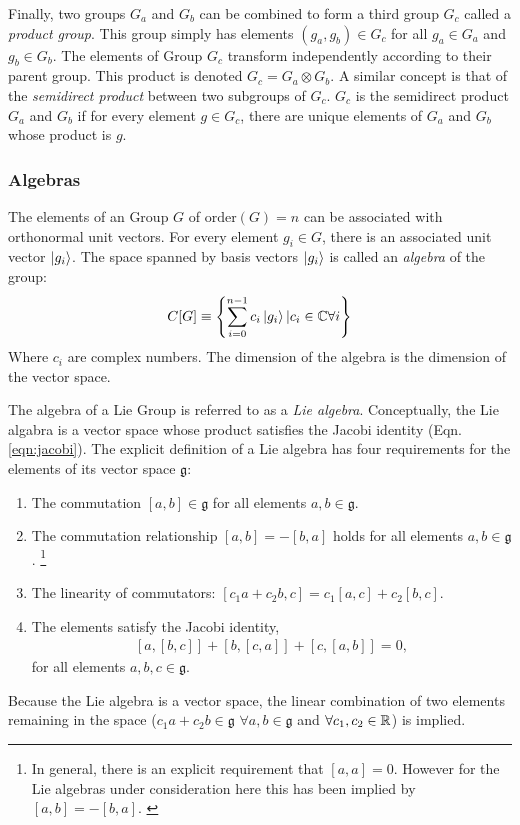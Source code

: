 Finally, two groups $G_a$ and $G_b$ can be combined to form a third group $G_c$ called a \emph{product group}.
This group simply has elements $(g_a,g_b)\in G_c$ for all $g_a\in G_a$ and $g_b\in G_b$.
The elements of Group $G_c$ transform independently according to their parent group.
This product is denoted $G_c=G_a\otimes G_b$.
A similar concept is that of the \emph{semidirect product} between two subgroups of $G_c$.
$G_c$ is the semidirect product $G_a$ and $G_b$ if for every element $g\in G_c$, there are unique elements of $G_a$ and $G_b$ whose product is $g$.

\subsubsection{Algebras}\label{sec:algebras}

The elements of an Group $G$ of $\text{order}(G)=n$ can be associated with orthonormal unit vectors. 
For every element $g_i\in G$, there is an associated unit vector $\ket{g_i}$.
The space spanned by basis vectors $\ket{g_i}$ is called an \emph{algebra} of the group:
\begin{equation}\begin{split}\label{eqn:algebra}
    C[G]\equiv\left\{\sum_{i=0}^{n-1}c_i\ket{g_i}\vert c_i\in \mathbb{C} \forall i\right\}
\end{split}\end{equation} 
Where $c_i$ are complex numbers. The dimension of the algebra is the dimension of the vector space.

The algebra of a Lie Group is referred to as a \emph{Lie algebra}.
Conceptually, the Lie algabra is a vector space whose product satisfies the Jacobi identity (Eqn. \ref{eqn:jacobi}).
The explicit definition of a Lie algebra has four requirements for the elements of its vector space $\mathfrak{g}$:
\begin{enumerate}
    \item The commutation $[a,b]\in\mathfrak{g}$ for all elements $a,b\in\mathfrak{g}$.
    \item The commutation relationship $[a,b]=-[b,a]$ holds for all elements $a,b\in\mathfrak{g}$. \footnote[1]{In general, there is an explicit requirement that $[a,a]=0$. However for the Lie algebras under consideration here this has been implied by $[a,b]=-[b,a]$. \cite{pfeifer}}
    \item The linearity of commutators: $[c_1a+c_2b,c]=c_1[a,c]+c_2[b,c]$.
    \item The elements satisfy the Jacobi identity,
    \begin{equation}\begin{split}\label{eqn:jacobi}
        [a,[b,c]]+[b,[c,a]]+[c,[a,b]]=0,
    \end{split}\end{equation} 
    for all elements $a,b,c\in\mathfrak{g}$.
\end{enumerate}
Because the Lie algebra is a vector space, the linear combination of two elements remaining in the space ($c_1a+c_2b\in\mathfrak{g}$ $\forall a,b\in\mathfrak{g}$ and  $\forall c_1,c_2\in\mathbb{R}$) is implied.


